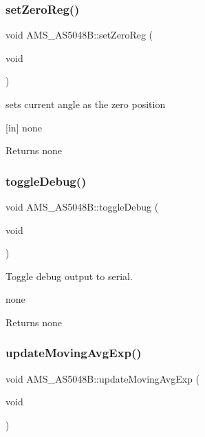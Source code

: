 \subsubsection{\texorpdfstring{set\+Zero\+Reg()}{setZeroReg()}}
{\footnotesize\ttfamily void A\+M\+S\+\_\+\+A\+S5048\+B\+::set\+Zero\+Reg (\begin{DoxyParamCaption}\item[{void}]{ }\end{DoxyParamCaption})}



sets current angle as the zero position 

\mbox{[}in\mbox{]} none \begin{DoxyReturn}{Returns}
none 
\end{DoxyReturn}
\mbox{\label{classAMS__AS5048B_ac2485a851c68e9a5b410c47ffc3485ca}} 
\subsubsection{\texorpdfstring{toggle\+Debug()}{toggleDebug()}}
{\footnotesize\ttfamily void A\+M\+S\+\_\+\+A\+S5048\+B\+::toggle\+Debug (\begin{DoxyParamCaption}\item[{void}]{ }\end{DoxyParamCaption})}



Toggle debug output to serial. 

none \begin{DoxyReturn}{Returns}
none 
\end{DoxyReturn}
\mbox{\label{classAMS__AS5048B_a20a1cab67cc2ec87135366723893b1aa}} 
\subsubsection{\texorpdfstring{update\+Moving\+Avg\+Exp()}{updateMovingAvgExp()}}
{\footnotesize\ttfamily void A\+M\+S\+\_\+\+A\+S5048\+B\+::update\+Moving\+Avg\+Exp (\begin{DoxyParamCaption}\item[{void}]{ }\end{DoxyParamCaption})}



